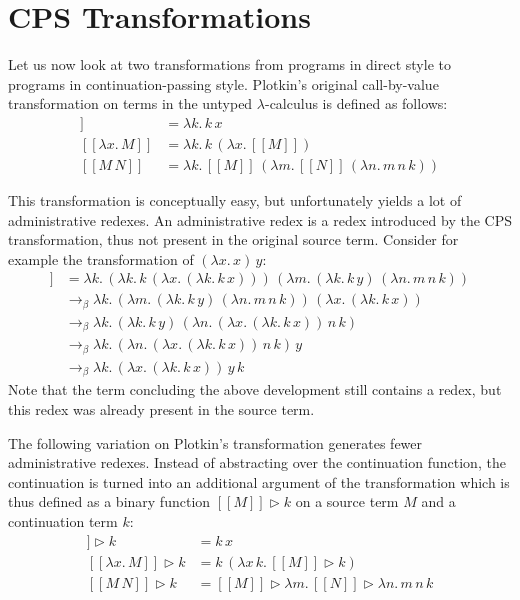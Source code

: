 \documentclass[a4paper,11pt,draft]{article}
\begin{document}
\section{CPS Transformations}\label{sec:transformations}

Let us now look at two transformations from programs in direct style to programs in
continuation-passing style. Plotkin's original call-by-value transformation on terms
in the untyped $\lambda$-calculus is defined as follows:
\begin{align*}
  [\![x]\!]               &= \lambda k. \, k \, x\\
  [\![\lambda x. \, M]\!] &= \lambda k. \, k \, (\lambda x. \, [\![M]\!])\\
  [\![M \, N]\!]          &= \lambda k. \, [\![M]\!] \, (\lambda m. \, [\![N]\!] \, (\lambda n. \, m \, n \, k))
\end{align*}

This transformation is conceptually easy, but unfortunately yields a lot of
administrative redexes. An administrative redex is a redex introduced by the CPS
transformation, thus not present in the original source term. Consider for example
the transformation of $(\lambda x. \, x) \, y$:
\begin{align*}
  [\![(\lambda x. \, x) \, y]\!] &= \lambda k. \, (\lambda k. \, k \, (\lambda x. \, (\lambda k. \, k \, x))) \, (\lambda m. \, (\lambda k. \, k \, y) \,
 (\lambda n. \, m \, n \, k))\\
                                 &\rightarrow_{\beta} \lambda k. \, (\lambda m. \, (\lambda k. \, k \, y) \, (\lambda n. \, m \, n \, k)) \, (\lambda x.
\, (\lambda k. \, k \, x))\\
                                 &\rightarrow_{\beta} \lambda k. \, (\lambda k. \, k \, y) \, (\lambda n. \, (\lambda x. \, (\lambda k. \, k \, x)) \, n
\, k)\\
                                 &\rightarrow_{\beta} \lambda k. \, (\lambda n. \, (\lambda x. \, (\lambda k. \, k \, x)) \, n \, k) \, y\\
                                 &\rightarrow_{\beta} \lambda k. \, (\lambda x. \, (\lambda k. \, k \, x)) \, y \, k
\end{align*}
Note that the term concluding the above development still contains a redex, but
this redex was already present in the source term.

The following variation on Plotkin's transformation generates fewer
administrative redexes. Instead of abstracting over the continuation function,
the continuation is turned into an additional argument of the transformation which
is thus defined as a binary function $[\![M]\!] \triangleright k$ on a source term
$M$ and a continuation term $k$:
\begin{align*}
  [\![x]\!] \triangleright k               &= k \, x\\
  [\![\lambda x. \, M]\!] \triangleright k &= k \, (\lambda x \, k. \, [\![M]\!] \triangleright k)\\
  [\![M \, N]\!] \triangleright k          &= [\![M]\!] \triangleright \lambda m. \, [\![N]\!] \triangleright \lambda n. \, m \, n \, k
\end{align*}
\end{document}
